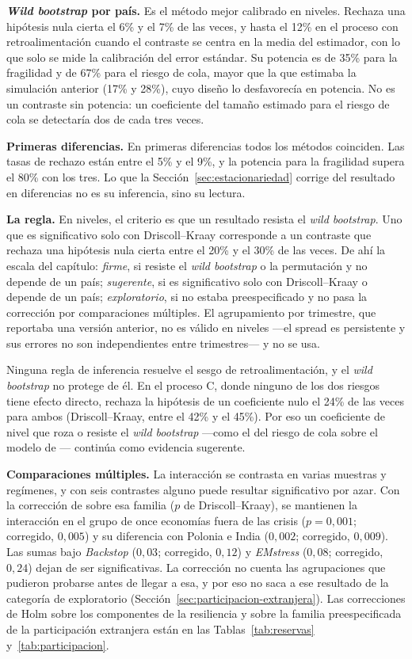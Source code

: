 \textbf{\textit{Wild bootstrap} por país.} Es el método mejor calibrado en niveles. Rechaza una hipótesis nula cierta el 6\% y el 7\% de las veces, y hasta el 12\% en el proceso con retroalimentación cuando el contraste se centra en la media del estimador, con lo que solo se mide la calibración del error estándar. Su potencia es de 35\% para la fragilidad y de 67\% para el riesgo de cola, mayor que la que estimaba la simulación anterior (17\% y 28\%), cuyo diseño lo desfavorecía en potencia. No es un contraste sin potencia: un coeficiente del tamaño estimado para el riesgo de cola se detectaría dos de cada tres veces.

\textbf{Primeras diferencias.} En primeras diferencias todos los métodos coinciden. Las tasas de rechazo están entre el 5\% y el 9\%, y la potencia para la fragilidad supera el 80\% con los tres. Lo que la Sección~\ref{sec:estacionariedad} corrige del resultado en diferencias no es su inferencia, sino su lectura.

\textbf{La regla.} En niveles, el criterio es que un resultado resista el \textit{wild bootstrap}. Uno que es significativo solo con Driscoll--Kraay corresponde a un contraste que rechaza una hipótesis nula cierta entre el 20\% y el 30\% de las veces. De ahí la escala del capítulo: \emph{firme}, si resiste el \textit{wild bootstrap} o la permutación y no depende de un país; \emph{sugerente}, si es significativo solo con Driscoll--Kraay o depende de un país; \emph{exploratorio}, si no estaba preespecificado y no pasa la corrección por comparaciones múltiples. El agrupamiento por trimestre, que reportaba una versión anterior, no es válido en niveles ---el spread es persistente y sus errores no son independientes entre trimestres--- y no se usa.

Ninguna regla de inferencia resuelve el sesgo de retroalimentación, y el \textit{wild bootstrap} no protege de él. En el proceso C, donde ninguno de los dos riesgos tiene efecto directo, rechaza la hipótesis de un coeficiente nulo el 24\% de las veces para ambos (Driscoll--Kraay, entre el 42\% y el 45\%). Por eso un coeficiente de nivel que roza o resiste el \textit{wild bootstrap} ---como el del riesgo de cola sobre el modelo de \citet{Chari2024b}--- continúa como evidencia sugerente.

\textbf{Comparaciones múltiples.} La interacción se contrasta en varias muestras y regímenes, y con seis contrastes alguno puede resultar significativo por azar. Con la corrección de \citet{Holm1979} sobre esa familia ($p$ de Driscoll--Kraay), se mantienen la interacción en el grupo de once economías fuera de las crisis ($p=0{,}001$; corregido, $0{,}005$) y su diferencia con Polonia e India ($0{,}002$; corregido, $0{,}009$). Las sumas bajo \textit{Backstop} ($0{,}03$; corregido, $0{,}12$) y \textit{EMstress} ($0{,}08$; corregido, $0{,}24$) dejan de ser significativas. La corrección no cuenta las agrupaciones que pudieron probarse antes de llegar a esa, y por eso no saca a ese resultado de la categoría de exploratorio (Sección~\ref{sec:participacion-extranjera}). Las correcciones de Holm sobre los componentes de la resiliencia y sobre la familia preespecificada de la participación extranjera están en las Tablas~\ref{tab:reservas} y~\ref{tab:participacion}.

